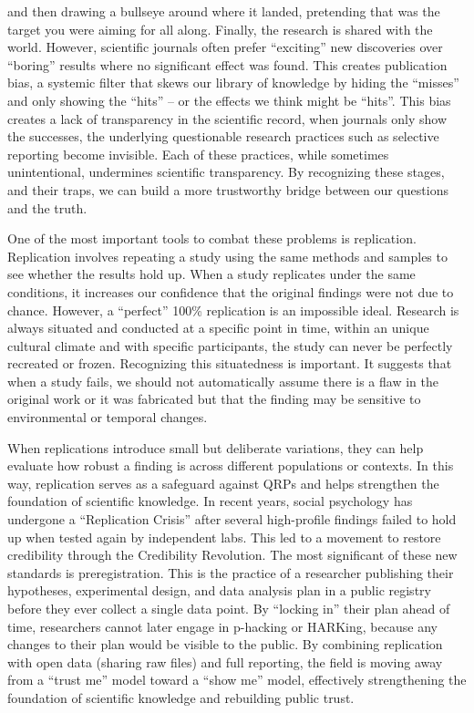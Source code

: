 \documentclass[
  letterpaper,
]{book}
\begin{document}
and then drawing a bullseye around where it landed, pretending that was
the target you were aiming for all along. Finally, the research is
shared with the world. However, scientific journals often prefer
``exciting'' new discoveries over ``boring'' results where no
significant effect was found. This creates publication bias, a systemic
filter that skews our library of knowledge by hiding the ``misses'' and
only showing the ``hits'' -- or the effects we think might be ``hits''.
This bias creates a lack of transparency in the scientific record, when
journals only show the successes, the underlying questionable research
practices such as selective reporting become invisible. Each of these
practices, while sometimes unintentional, undermines scientific
transparency. By recognizing these stages, and their traps, we can build
a more trustworthy bridge between our questions and the truth.

One of the most important tools to combat these problems is replication.
Replication involves repeating a study using the same methods and
samples to see whether the results hold up. When a study replicates
under the same conditions, it increases our confidence that the original
findings were not due to chance. However, a ``perfect'' 100\%
replication is an impossible ideal. Research is always situated and
conducted at a specific point in time, within an unique cultural climate
and with specific participants, the study can never be perfectly
recreated or frozen. Recognizing this situatedness is important. It
suggests that when a study fails, we should not automatically assume
there is a flaw in the original work or it was fabricated but that the
finding may be sensitive to environmental or temporal changes.

When replications introduce small but deliberate variations, they can
help evaluate how robust a finding is across different populations or
contexts. In this way, replication serves as a safeguard against QRPs
and helps strengthen the foundation of scientific knowledge. In recent
years, social psychology has undergone a ``Replication Crisis'' after
several high-profile findings failed to hold up when tested again by
independent labs. This led to a movement to restore credibility through
the Credibility Revolution. The most significant of these new standards
is preregistration. This is the practice of a researcher publishing
their hypotheses, experimental design, and data analysis plan in a
public registry before they ever collect a single data point. By
``locking in'' their plan ahead of time, researchers cannot later engage
in p-hacking or HARKing, because any changes to their plan would be
visible to the public. By combining replication with open data (sharing
raw files) and full reporting, the field is moving away from a ``trust
me'' model toward a ``show me'' model, effectively strengthening the
foundation of scientific knowledge and rebuilding public trust.
\end{document}
